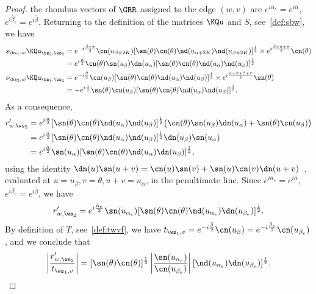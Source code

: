 \documentclass[a4paper,twoside,11pt]{article}
\begin{document}
\begin{proof}
the rhombus vectors of $\GRR$ assigned to the edge $(w,v)$ are $e^{i\bar{\alpha}_e}=e^{i\bar{\alpha}}$, $e^{i\bar{\beta}_e}=e^{i\bar{\beta}}$.
Returning to the definition of the matrices $\KQu$ and $S$, see~\eqref{def:sbw}, we have
\begin{align*}
s_{\bs_1,w}\KQu_{\bs_2,\ws_2}&= e^{-i\frac{\bar{\beta}+\pi}{2}}\cn(u_{\beta+2K})
  [\sn(\theta)\cn(\theta)\nd(u_{\alpha+2K})\nd(u_{\beta+2K})]^{\frac{1}{2}}\times
  e^{i\frac{\bar{\beta}+\bar{\alpha}+\pi}{2}}\cn(\theta)\\
  &=e^{i\frac{\bar{\alpha}}{2}}\cn(\theta)\sn(u_{\beta})\dn(u_\alpha)[\sn(\theta)\cn(\theta)\nd(u_{\alpha})\nd(u_{\beta})]^{\frac{1}{2}}\\
s_{\bs_2,w}\KQu_{\bs_1,\ws_2}&=
   e^{-i\frac{\bar{\beta}}{2}}\cn(u_{\beta})
  [\sn(\theta)\cn(\theta)\nd(u_{\alpha})\nd(u_{\beta})]^{\frac{1}{2}}\times
  e^{i\frac{\bar{\alpha}+\pi+\bar{\beta}+\pi}{2}}\sn(\theta)\\
&=-e^{i\frac{\bar{\alpha}}{2}}\sn(\theta)\cn(u_\beta)[\sn(\theta)\cn(\theta)\nd(u_\alpha)\nd(u_\beta)]^{\frac{1}{2}}.
\end{align*}
As a consequence,
\begin{align*}
r'_{w,\ws_2}&=
e^{i\frac{\bar{\alpha}}{2}}[\sn(\theta)\cn(\theta)\nd(u_{\alpha})\nd(u_{\beta})]^{\frac{1}{2}}
\bigl(\cn(\theta)\sn(u_{\beta})\dn(u_\alpha)+\sn(\theta)\cn(u_\beta)\bigr)\nonumber\\
&=e^{i\frac{\bar{\alpha}}{2}}[\sn(\theta)\cn(\theta)\nd(u_{\alpha})\nd(u_{\beta})]^{\frac{1}{2}}\dn(u_\beta)\sn(u_\alpha)\nonumber\\
&=e^{i\frac{\bar{\alpha}}{2}}\sn(u_\alpha)[\sn(\theta)\cn(\theta)\nd(u_\alpha)\dn(u_\beta)]^{\frac{1}{2}},
\end{align*}
using the identity 
$\dn(u)\sn(u+v)=\cn(u)\sn(v)+\sn(u)\cn(v)\dn(u+v)$~\cite[chap.2, ex.32 (ii)]{Lawden}, evaluated at $u=u_\beta,v=\theta,u+v=u_\alpha$, in the penultimate line.
Since $e^{i\bar{\alpha}_e}=e^{i\bar{\alpha}}$, $e^{i\bar{\beta}_e}=e^{i\bar{\beta}}$, we have
\begin{equation}\label{equ:cuv}
r'_{w,\ws_2}=e^{i\frac{\bar{\alpha}_e}{2}}\sn(u_{\alpha_e})[\sn(\theta)\cn(\theta)\nd(u_{\alpha_e})\dn(u_{\beta_e})]^{\frac{1}{2}}.
\end{equation}
By definition of $T$, see~\eqref{def:twvf}, we have $t_{\ws_1,v}=e^{-i\frac{\bar{\beta}}{2}}\cn(u_{\beta})=e^{-i\frac{\bar{\beta}_e}{2}}\cn(u_{\beta_e})$,
and we conclude that 
\begin{equation*}
\left|\frac{r'_{w,\ws_2}}{t_{\ws_1,v}}\right|=[\sn(\theta)\cn(\theta)]^\frac{1}{2}
\left|\frac{\sn(u_{\alpha_e})}{\cn(u_{\beta_e})}\right|[\nd(u_{\alpha_e})\dn(u_{\beta_e})]^{\frac{1}{2}}.
\end{equation*}


\end{proof}
\end{document}

